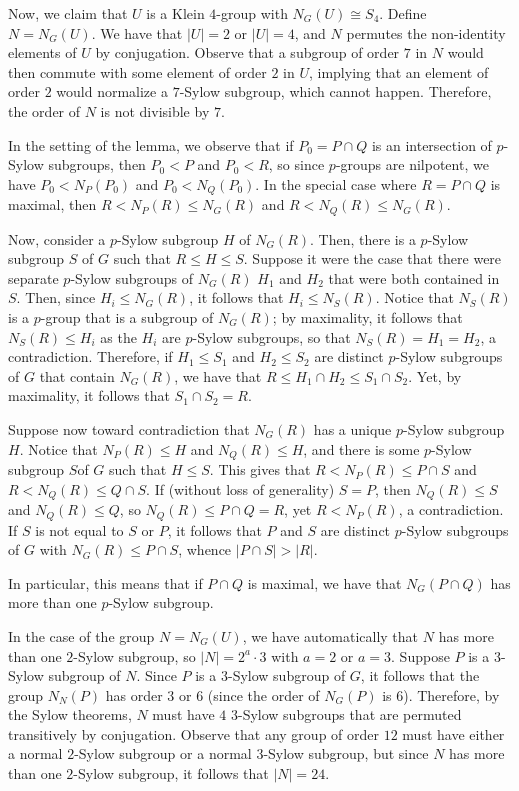 \documentclass[10pt]{mypackage}
\begin{document}
Now, we claim that $U$ is a Klein $4$-group with $N_G(U)\cong S_4$. Define $N = N_G(U)$. We have that $\left\vert U \right\vert = 2$ or $\left\vert U \right\vert = 4$, and $N$ permutes the non-identity elements of $U$ by conjugation. Observe that a subgroup of order $7$ in $N$ would then commute with some element of order $2$ in $U$, implying that an element of order $2$ would normalize a $7$-Sylow subgroup, which cannot happen. Therefore, the order of $N$ is not divisible by $7$.
\begin{remark}
In the setting of the lemma, we observe that if $P_0 = P\cap Q$ is an intersection of $p$-Sylow subgroups, then $P_0 < P$ and $P_0 < R$, so since $p$-groups are nilpotent, we have $P_0 < N_P\left( P_0 \right)$ and $P_0 < N_Q\left( P_0 \right)$. In the special case where $R = P\cap Q$ is maximal, then $R < N_P(R) \leq N_G(R)$ and $R < N_Q(R) \leq N_G(R)$.

Now, consider a $p$-Sylow subgroup $H$ of $N_G\left( R \right)$. Then, there is a $p$-Sylow subgroup $S$ of $G$ such that $R\leq H \leq S$. Suppose it were the case that there were separate $p$-Sylow subgroups of $N_G(R)$ $H_1$ and $H_2$ that were both contained in $S$. Then, since $H_i\leq N_G(R)$, it follows that $H_i\leq N_S(R)$. Notice that $N_S(R)$ is a $p$-group that is a subgroup of $N_G(R)$; by maximality, it follows that $N_S(R)\leq H_i$ as the $H_i$ are $p$-Sylow subgroups, so that $N_S(R) = H_1 = H_2$, a contradiction. Therefore, if $H_1\leq S_1$ and $H_2\leq S_2$ are distinct $p$-Sylow subgroups of $G$ that contain $N_G(R)$, we have that $R\leq H_1\cap H_2 \leq S_1\cap S_2$. Yet, by maximality, it follows that $S_1\cap S_2 = R$.

Suppose now toward contradiction that $N_G(R)$ has a unique $p$-Sylow subgroup $H$. Notice that $N_P(R) \leq H$ and $N_Q(R)\leq H$, and there is some $p$-Sylow subgroup $S $of $G$ such that $H\leq S$. This gives that $R < N_P(R) \leq P\cap S$ and $R < N_Q(R) \leq Q\cap S$. If (without loss of generality) $S = P$, then $N_Q(R) \leq S$ and $N_Q(R)\leq Q$, so $N_Q(R) \leq P\cap Q = R$, yet $R < N_P(R)$, a contradiction. If $S$ is not equal to $S$ or $P$, it follows that $P$ and $S$ are distinct $p$-Sylow subgroups of $G$ with $N_G(R) \leq P\cap S$, whence $\left\vert P\cap S \right\vert > \left\vert R \right\vert$.

In particular, this means that if $P\cap Q$ is maximal, we have that $N_G\left( P\cap Q \right)$ has more than one $p$-Sylow subgroup.
\end{remark}
In the case of the group $N = N_G(U)$, we have automatically that $N$ has more than one $2$-Sylow subgroup, so $\left\vert N \right\vert = 2^{a}\cdot 3$ with $a = 2$ or $a = 3$. Suppose $P$ is a $3$-Sylow subgroup of $N$. Since $P$ is a $3$-Sylow subgroup of $G$, it follows that the group $N_N(P)$ has order $3$ or $6$ (since the order of $N_G(P)$ is $6$). Therefore, by the Sylow theorems, $N$ must have $4$ $3$-Sylow subgroups that are permuted transitively by conjugation. Observe that any group of order $12$ must have either a normal $2$-Sylow subgroup or a normal $3$-Sylow subgroup, but since $N$ has more than one $2$-Sylow subgroup, it follows that $\left\vert N \right\vert = 24$.
\end{document}
